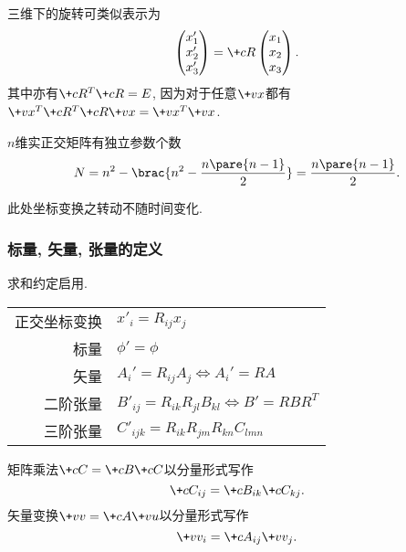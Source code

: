 \documentclass{ctexart}
\begin{document}
\begin{lemma}
    三维下的旋转可类似表示为
    \[ \begin{pmatrix}
        x'_1 \\
        x'_2 \\
        x'_3
    \end{pmatrix} = \+cR \begin{pmatrix}
        x_1 \\
        x_2 \\
        x_3
    \end{pmatrix}. \]
    其中亦有$\+cR^T\+cR = E$, 因为对于任意$\+vx$都有$\+vx^T\+cR^T\+cR\+vx = \+vx^T\+vx$.
\end{lemma}
\begin{lemma}
    $n$维实正交矩阵有独立参数个数
    \[ N = n^2 - \brac{n^2 - \frac{n\pare{n-1}}{2}} = \frac{n\pare{n-1}}{2}. \]
\end{lemma}
\begin{pitfall}
    此处坐标变换之转动不随时间变化.
\end{pitfall}


\subsubsection{标量, 矢量, 张量的定义} %
\label{ssub:标量_矢量_张量的定义}

\begin{mtips}
    求和约定启用.
\end{mtips}
\begin{longtable}{rl}
    正交坐标变换 & $\displaystyle x'_i = R_{ij}x_j$ \\
    标量 & $\phi' = \phi$ \\
    矢量 & $A_i' = R_{ij}A_j\Leftrightarrow A_i' = RA$ \\
    二阶张量 & $B'_{ij} = R_{ik}R_{jl}B_{kl} \Leftrightarrow B' = RBR^T$ \\
    三阶张量 & $C'_{ijk} = R_{ik}R_{jm}R_{kn}C_{lmn}$ \\
\end{longtable}
\begin{mtips}
    矩阵乘法$\+cC = \+cB\+cC$以分量形式写作
    \[ \+cC_{ij} = \+cB_{ik}\+cC_{kj}. \]
    矢量变换$\+vv = \+cA\+vu$以分量形式写作
    \[ \+vv_i = \+cA_{ij}\+vv_j. \]
\end{mtips}


\end{document}
